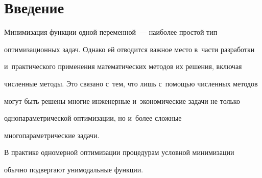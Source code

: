 




















      \thispagestyle{headings}


      


      \vspace*{-13pt} 





\section{Введение}





\vspace*{-3pt}





  Минимизация функции одной переменной~--- наиболее простой тип 


оптимизационных задач. Однако ей отводится важное место в~части разработки 


и~практического применения математических методов их решения, включая 


чис\-лен\-ные методы. Это связано с~тем, что лишь с~помощью численных методов 


могут быть решены многие инженерные и~экономические задачи не только 


однопараметрической оптимизации, но и~более сложные 


многопараметрические задачи. 


  


  В практике одномерной оптимизации процедурам условной минимизации 


обычно подвергают унимодальные функции. 


